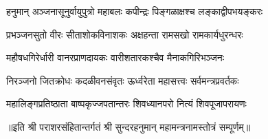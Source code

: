 

\twolineshloka
{हनुमान् अञ्जनासूनुर्वायुपुत्रो महाबलः}
{कपीन्द्रः पिङ्गळाक्षश्च लङ्काद्वीपभयङ्करः}

\twolineshloka
{प्रभञ्जनसुतो वीरः सीताशोकविनाशकः}
{अक्षहन्ता रामसखो रामकार्यधुरन्धरः}

\twolineshloka
{महौषधगिरेर्धारी वानरप्राणदायकः}
{वारीशतारकश्चैव मैनाकगिरिभञ्जनः}

\twolineshloka
{निरञ्जनो जितक्रोधः कदळीवनसंवृतः}
{ऊर्ध्वरेता महासत्त्वः सर्वमन्त्रप्रवर्तकः}

\twolineshloka
{महालिङ्गप्रतिष्ठाता बाष्पकृज्जपतान्तरः}
{शिवध्यानपरो नित्यं शिवपूजापरायणः}


॥इति श्री पराशरसंहितान्तर्गतं श्री सुन्दरहनुमान् महामन्त्रनामस्तोत्रं सम्पूर्णम्॥